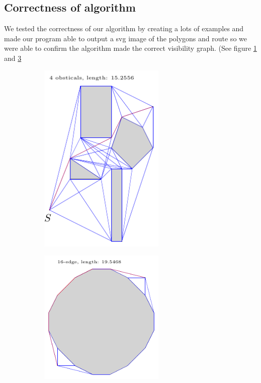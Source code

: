\subsection{Correctness of algorithm}
We tested the correctness of our algorithm by creating a lots of examples and
made our program able to output a svg image of the polygons and route so we
were able to confirm the algorithm made the correct visibility graph. (See
figure \ref{fig:correctness_1} and \ref{fig:correctness_2}
\begin{figure}[H]
	\caption{Examples of figures for correctness}
	\begin{subfigure}{.5\textwidth}
		\includegraphics[width=6cm]{figures/correctness1.pdf}
		\caption{}
		\label{fig:correctness_1}
	\end{subfigure}
	\begin{subfigure}{.5\textwidth}
		\includegraphics[width=6cm]{figures/correctness2.pdf}
		\caption{}
		\label{fig:correctness_2}
	\end{subfigure}
\end{figure}

